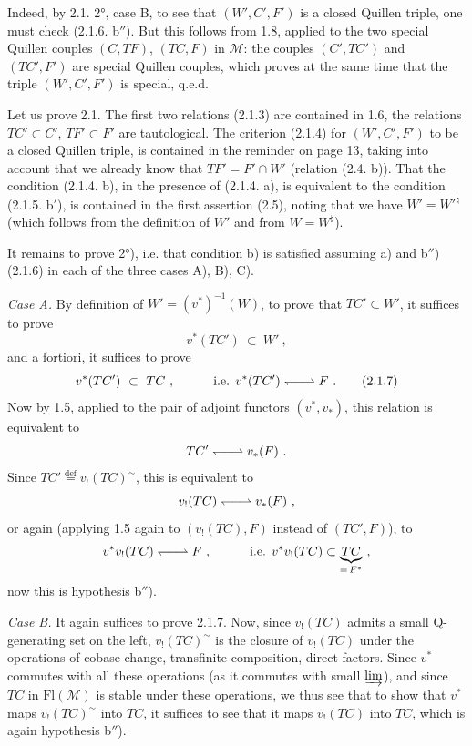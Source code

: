 \documentclass[11pt]{article}
\newcommand{\printedpage}[1]{\marginpar{\footnotesize p.~#1}}
\newcommand{\msp}[1]{\marginpar{\footnotesize [#1]}}
\newcommand{\M}{\mathcal{M}}
\newcommand{\Fl}{\mathrm{Fl}}
\newcommand{\harp}{\mathrel{\leftharpoondown\joinrel\relbar\joinrel\rightharpoonup}}
\begin{document}
\printedpage{11}

\msp{page 17}
Indeed, by 2.1. 2°, case B, to see that $(W',C',F')$ is a closed Quillen triple, one must check (2.1.6. b$''$). But this follows from 1.8, applied to the two special Quillen couples $(C,TF)$, $(TC,F)$ in $\M$: the couples $(C',TC')$ and $(TC',F')$ are special Quillen couples, which proves at the same time that the triple $(W',C',F')$ is special, q.e.d. %

Let us prove 2.1. The first two relations (2.1.3) are contained in 1.6, the relations $TC' \subset C'$, $TF' \subset F'$ are tautological. The criterion (2.1.4) for $(W',C',F')$ to be a closed Quillen triple, is contained in the reminder on page 13, taking into account that we already know that $TF' = F' \cap W'$ (relation (2.4. b)). That the condition (2.1.4. b), in the presence of (2.1.4. a), is equivalent to the condition (2.1.5. b$'$), is contained in the first assertion (2.5), noting that we have $W' = W'^{\natural}$ (which follows from the definition of $W'$ and from $W = W^{\natural}$).

It remains to prove 2°), i.e. that condition b) is satisfied assuming a) and b$''$) (2.1.6) in each of the three cases A), B), C).

\textit{Case A.} By definition of $W' = (v^*)^{-1}(W)$, to prove that $TC' \subset W'$, it suffices to prove
\[
v^*(TC')\ \subset\ W'\ ,  %
\]
and a fortiori, it suffices to prove
\[
v^*(TC')\ \subset\ TC\ ,\qquad\quad \text{i.e. } v^*(TC') \harp F\ .
\tag*{(2.1.7)} %
\]
Now by 1.5, applied to the pair of
\msp{page 18}
adjoint functors $(v^*,v_*)$, this relation is equivalent to
\[
TC' \harp v_*(F)\ .
\]
Since $TC' \overset{\text{def}}{=} v_!(TC)^{\sim}$, this is equivalent to
\[
v_!(TC) \harp v_*(F)\ ,
\]
or again (applying 1.5 again to $(v_!(TC),F)$ instead of $(TC',F)$), to
\[
v^*v_!(TC) \harp F\ ,\qquad\quad \text{i.e. } v^*v_!(TC) \subset \underbrace{TC}_{=\,F^*}\ ,
\]
now this is hypothesis b$''$).

\textit{Case B.} It again suffices to prove 2.1.7. Now, since $v_!(TC)$ admits a small Q-generating set on the left, $v_!(TC)^{\sim}$ is the closure of $v_!(TC)$ under the operations of cobase change, transfinite composition, direct factors. Since $v^*$ commutes with all these operations (as it commutes with small $\varinjlim$), and since $TC$ in $\Fl(\M)$ is stable under these operations, we thus see that to show that $v^*$ maps $v_!(TC)^{\sim}$ into $TC$, it suffices to see that it maps $v_!(TC)$ into $TC$, which is again hypothesis b$''$).
\end{document}

